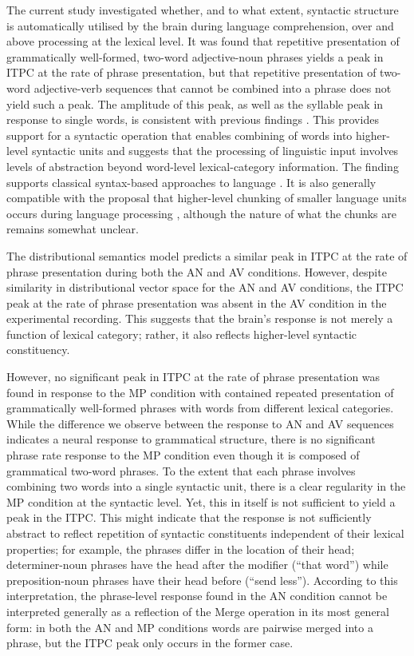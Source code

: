 \documentclass[10pt,letterpaper]{article}
\newcommand{\citet}[1]{\cite{#1}}
\begin{document}
The current study investigated whether, and to what extent, syntactic structure is automatically utilised by the brain during language comprehension, over and above processing at the lexical level. It was found that repetitive presentation of grammatically well-formed, two-word adjective-noun phrases yields a peak in ITPC at the rate of phrase presentation, but that repetitive presentation of two-word adjective-verb sequences that cannot be combined into a phrase does not yield such a peak. The amplitude of this peak, as well as the syllable peak in response to single words, is consistent with previous findings \citet{DingEtAl2017}. This provides support for a syntactic operation that enables combining of words into higher-level syntactic units and suggests that the processing of linguistic input involves levels of abstraction beyond word-level lexical-category information. The finding supports classical syntax-based approaches to language \citet{BerwickEtAl2013,EveraertEtAl2015,Chomsky1995}. It is also generally compatible with the proposal that higher-level chunking of smaller language units occurs during language processing \citet{ChristiansenChater2016}, although the nature of what the chunks are remains somewhat unclear.

The distributional semantics model predicts a similar peak in ITPC at the rate of phrase presentation during both the AN and AV conditions. However, despite similarity in distributional vector space for the AN and AV conditions, the ITPC peak at the rate of phrase presentation was absent in the AV condition in the experimental recording. This suggests that the brain's response is not merely a function of lexical category; rather, it also reflects higher-level syntactic constituency.

However, no significant peak in ITPC at the rate of phrase presentation was found in response to the MP condition with contained repeated presentation of grammatically well-formed phrases with words from different lexical categories. While the difference we observe between the response to AN and AV sequences indicates a neural response to grammatical structure, there is no significant phrase rate response to the MP condition even though it is composed of grammatical two-word phrases. To the extent that each phrase involves combining two words into a single syntactic unit, there is a clear regularity in the MP condition at the syntactic level. Yet, this in itself is not sufficient to yield a peak in the ITPC. This might indicate that the response is not sufficiently abstract to reflect repetition of syntactic constituents independent of their lexical properties; for example, the phrases differ in the location of their head; determiner-noun phrases have the head after the modifier (``that word'') while preposition-noun phrases have their head before (``send less''). According to this interpretation, the phrase-level response found in the AN condition cannot be interpreted generally as a reflection of the Merge operation \citet{Chomsky1995} in its most general form: in both the AN and MP conditions words are pairwise merged into a phrase, but the ITPC peak only occurs in the former case.
\end{document}
